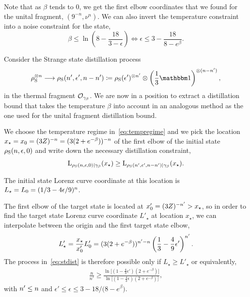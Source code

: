 \documentclass[pra,
aps,
twocolumn,
superscriptaddress,
groupedaddress,
nofootinbib,
reprint
]{revtex4-1}
\begin{document}
Note that as $\beta$ tends to $0$, we get the first elbow coordinates that we found for the unital fragment, $(9^{-n}, \nu^n)$.
We can also invert the temperature constraint into a noise constraint for the state,
\begin{equation}\label{eq:tempregime}
	\beta \leq \ln{\left(8-\frac{18}{3-\epsilon}\right)} \Leftrightarrow \epsilon \leq 3 - \frac{18}{8-e^{\beta}}.
\end{equation}

Consider the Strange state distillation process
\begin{equation}\label{eq:stdist}
	\noisys\too{\nn} \longrightarrow \noisys(\tt, \epsilon', \nn - \nn') \coloneqq  \noisys(\epsilon')\too{\tt} \otimes \left( \frac{1}{3}\id \right)\too{(\nn-\tt)},
\end{equation}
in the thermal fragment $\O_{\gamma_\beta}$.
We are now in a position to extract a distillation bound that takes the temperature $\beta$ into account in an analogous method as the one used for the unital fragment distillation bound.

We choose the temperature regime in~\cref{eq:tempregime} and we pick the location $x_\star = x_0 = (3Z)^{-\nn} = (3(2+e^{-\beta}))^{-\nn}$ of the first elbow of the initial state $\noisys(\nn, \epsilon, 0)$ and write down the necessary distillation constraint, 
\begin{equation}
	\lc{\noisys(\nn, \epsilon, 0)}{\gamma_\beta}(x_\star) \geq \lc{\noisys(\tt, \epsilon', \nn-\tt)}{\gamma_\beta}(x_\star).
\end{equation}

The initial state Lorenz curve coordinate at this location is $L_\star = L_0 = (1/3 - 4\epsilon/9)^{\nn}$.

The first elbow of the target state is located at $x'_0 = (3Z)^{-\tt} > x_\star$, so in order to find the target state Lorenz curve coordinate $L'_\star$ at location $x_\star$, we can interpolate between the origin and the first target state elbow, 
\begin{equation}\label{eq:constraint_deriv_temp}
	L'_\star = \frac{x_\star}{x'_0}L'_0 = (3(2+e^{-\beta}))^{\tt-\nn} \left( \frac{1}{3} - \frac{4}{9} \epsilon' \right)^{\tt}.
\end{equation}
The process in~\cref{eq:stdist} is therefore possible only if $L_\star \geq L'_\star$ or equivalently,
\begin{align}
	\frac{n}{n'} \geq \frac{\ln{\Big[ (1-\frac{4}{3}\epsilon')(2+e^{-\beta}) \Big]}}{\ln{\Big[ (1-\frac{4}{3}\epsilon)(2+e^{-\beta}) \Big]}},
\end{align}
with $\tt \leq \nn$ and $\epsilon' \leq \epsilon \leq 3 - 18/\big(8-e^{\beta}\big)$.
\end{document}
